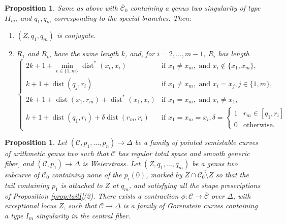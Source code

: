 \documentclass[11pt]{amsart}
\renewcommand{\to}{\rightarrow}
\newcommand{\dvr}{\Delta}
\newcommand{\dist}{\operatorname{dist}}
\theoremstyle{plain}
\newtheorem{prop}[thm]{Proposition}
\theoremstyle{definition}
\begin{document}
\begin{prop}\label{prop:tailII}
 Same as above with $\overline{\mathcal C}_0$ containing a genus two singularity of type $I\!I_m$, and $q_1,q_m$ corresponding to the special branches. Then:
 \begin{enumerate}[leftmargin=.6cm]
  \item $(Z,q_1,q_m)$ is conjugate.
  \item $R_1$ and $R_m$ have the same length $k$, and, for $i=2,\ldots,m-1$, $R_i$ has length 
  \begin{equation*}
  \begin{cases}
   2k+1+\min_{\epsilon\in\{1,m\}}\dist^*(x_\epsilon,x_i) & \text{if } x_1\neq x_m, \text{ and } x_i\notin\{x_1,x_m\},\\
   k+1+\dist(q_j, r_i)  & \text{if } x_1\neq x_m, \text{ and } x_i=x_j, j\in\{1,m\}, \\
   2k+1+\dist(x_1,r_m)+\dist^*(x_1,x_i) & \text{if } x_1= x_m, \text{ and } x_i\neq x_1, \\
   k+1+\dist(q_1, r_i)+\delta\dist(r_m,r_i)& \text{if } x_1= x_m= x_i, \delta=\begin{cases} 1 & r_m\in[q_1,r_i] \\ 0 & \text{otherwise.} \end{cases}
  \end{cases} 
  \end{equation*}
 \end{enumerate}
\end{prop}
\begin{prop}\label{prop:contractionI}
 Let $(\mathcal C,p_1,\ldots,p_n)\to\dvr$ be a family of pointed semistable curves of arithmetic genus two such that $\mathcal C$ has regular total space and smooth generic fiber, and $(\mathcal C,p_1)\to \Delta$ is Weierstrass. Let $(Z,q_1,\ldots,q_m)$ be a genus two subcurve of $\mathcal C_0$ containing none of the $p_i(0)$, marked by $Z\cap \overline{\mathcal C_0\setminus Z}$ so that the tail containing $p_1$ is attached to $Z$ at $q_m$, and satisfying all the shape prescriptions of Proposition \ref{prop:tailI}(2). There exists a contraction $\phi\colon\mathcal C\to\overline{\mathcal C}$ over $\dvr$, with exceptional locus $Z$, such that $\overline{\mathcal C}\to\dvr$ is a family of Gorenstein curves containing a type $I_m$ singularity in the central fiber.
\end{prop}
\end{document}
